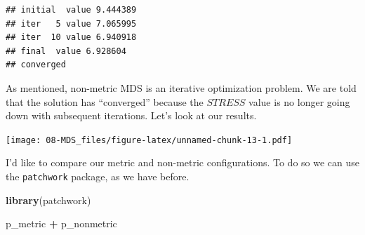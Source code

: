 \documentclass[
]{book}
\newenvironment{Shaded}{\begin{snugshade}}{\end{snugshade}}
\newcommand{\AttributeTok}[1]{\textcolor[rgb]{0.13,0.29,0.53}{#1}}
\newcommand{\FunctionTok}[1]{\textcolor[rgb]{0.13,0.29,0.53}{\textbf{#1}}}
\newcommand{\NormalTok}[1]{#1}
\newcommand{\OtherTok}[1]{\textcolor[rgb]{0.56,0.35,0.01}{#1}}
\newcommand{\SpecialCharTok}[1]{\textcolor[rgb]{0.81,0.36,0.00}{\textbf{#1}}}
\newcommand{\StringTok}[1]{\textcolor[rgb]{0.31,0.60,0.02}{#1}}
\begin{document}
\begin{verbatim}
## initial  value 9.444389 
## iter   5 value 7.065995
## iter  10 value 6.940918
## final  value 6.928604 
## converged
\end{verbatim}

As mentioned, non-metric MDS is an iterative optimization problem. We are told that the solution has ``converged'' because the \(STRESS\) value is no longer going down with subsequent iterations. Let's look at our results.

\begin{Shaded}
\end{Shaded}

\texttt{[image: 08-MDS\_files/figure-latex/unnamed-chunk-13-1.pdf]}

I'd like to compare our metric and non-metric configurations. To do so we can use the \texttt{patchwork} package, as we have before.

\begin{Shaded}
\begin{Highlighting}[]
\FunctionTok{library}\NormalTok{(patchwork)}

\NormalTok{p\_metric }\SpecialCharTok{+}\NormalTok{ p\_nonmetric}
\end{Highlighting}
\end{Shaded}
\end{document}
